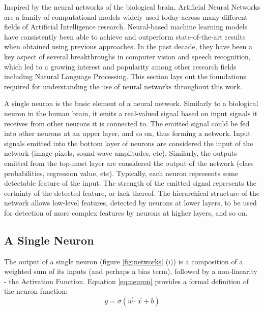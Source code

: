 Inspired by the neural networks of the biological brain, Artificial Neural Networks are a family of computational models widely used today across many different fields of Artificial Intelligence research. Neural-based machine learning models have consistently been able to achieve and outperform state-of-the-art results when obtained using previous approaches. In the past decade, they have been a key aspect of several breakthroughs in computer vision and speech recognition, which led to a growing interest and popularity among other research fields including Natural Language Processing. This section lays out the foundations required for understanding the use of neural networks throughout this work.

\medskip

A single neuron is the basic element of a neural network. Similarly to a biological neuron in the human brain, it emits a real-valued signal based on input signals it receives from other neurons it is connected to. The emitted signal could be fed into other neurons at an upper layer, and so on, thus forming a network. Input signals emitted into the bottom layer of neurons are considered the input of the network (image pixels, sound wave amplitudes, etc). Similarly, the outputs emitted from the top-most layer are considered the output of the network (class probabilities, regression value, etc). Typically, each neuron represents some detectable feature of the input. The strength of the emitted signal represents the certainty of the detected feature, or lack thereof. The hierarchical structure of the network allows low-level features, detected by neurons at lower layers, to be used for detection of more complex features by neurons at higher layers, and so on.

\medskip

\subsection{A Single Neuron}

The output of a single neuron (figure \ref{fig:networks} (i)) is a composition of a weighted sum of its inputs (and perhaps a bias term), followed by a non-linearity - the Activation Function. Equation \ref{eq:neuron} provides a formal definition of the neuron function:
\begin{equation}
y = \sigma(\vec{w}\cdot\vec{x} + b)
\label{eq:neuron}
\end{equation}

